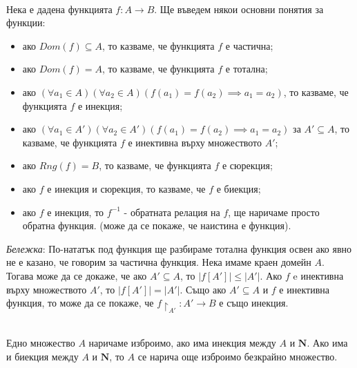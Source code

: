 \documentclass[12pt,twoside,a4paper]{article}
\begin{document}
	\begin{definitions}~\\
		\indent Нека е дадена функцията $f \colon A \to B$. Ще въведем някои основни понятия за функции:
		\begin{itemize}
			\item ако $Dom(f) \subseteq A$, то казваме, че функцията $f$ е частична;
			\item ако $Dom(f) = A$, то казваме, че функцията $f$ е тотална;
			\item ако $(\forall a_1 \in A)(\forall a_2 \in A)(f(a_1) = f(a_2) \implies a_1 = a_2)$, то казваме, че функцията $f$ е инекция;
			\item ако $(\forall a_1 \in A')(\forall a_2 \in A')(f(a_1) = f(a_2) \implies a_1 = a_2)$ за $A' \subseteq A$, то казваме, че функцията $f$ е инективна върху множеството $A'$;
			\item ако $Rng(f) = B$, то казваме, че функцията $f$ е сюрекция;
			\item ако $f$ е инекция и сюрекция, то казваме, че $f$ е биекция;
			\item ако $f$ е инекция, то $f^{-1}$ - обратната релация на $f$, ще наричаме просто обратна функция. (може да се покаже, че наистина е функция).
		\end{itemize}
		
		\textit{Бележка}: По-нататък под функция ще разбираме тотална функция освен ако явно не е казано, че говорим за частична функция.	Нека имаме краен домейн $A$. Тогава може да се докаже, че ако $A' \subseteq A$, то $|f[A']| \le |A'|$. Ако $f$ e инективна върху множеството $A'$, то $|f[A']| = |A'|$. Също ако $A' \subseteq A$ и $f$ е инективна функция, то може да се покаже, че $f\restriction_{A'} \colon A' \to B$ е също инекция. 
	\end{definitions}
	
	\begin{definitions}~\\
		\indent Едно множество $A$ наричаме изброимо, ако има инекция между $A$ и $\mathbf{N}$. Ако има и биекция между $A$ и $\mathbf{N}$, то $A$ се нарича още изброимо безкрайно множество.
	\end{definitions}
	
\end{document}
